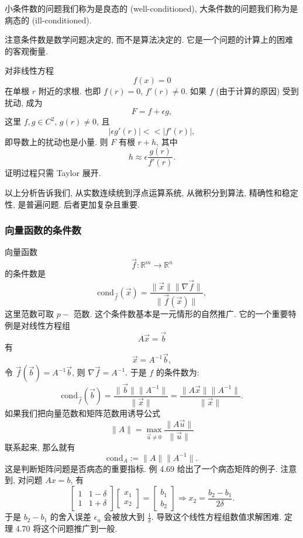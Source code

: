 \documentclass[a4paper]{ctexart}
\begin{document}
 小条件数的问题我们称为是良态的 (well-conditioned),
大条件数的问题我们称为是病态的 (ill-conditioned).

注意条件数是数学问题决定的, 而不是算法决定的. 它是一个问题的计算上的困难的客观衡量.

 对非线性方程
$$
f(x) = 0
$$
在单根 $r$ 附近的求根. 也即 $f(r) = 0$, $f'(r) \neq 0$.
如果 $f$ (由于计算的原因) 受到扰动, 成为
$$
F = f + \epsilon g,
$$
这里 $f, g \in C^2$, $g(r) \neq 0$, 且
$$
|\epsilon g'(r)| << |f'(r)|,
$$
即导数上的扰动也是小量. 则 $F$ 有根 $r + h$, 其中
$$
h \approx \epsilon \frac{g(r)}{f'(r)}.
$$
证明过程只需 Taylor 展开.

以上分析告诉我们, 从实数连续统到浮点运算系统, 从微积分到算法, 精确性和稳定性,
是普遍问题. 后者更加复杂且重要.

\subsubsection{向量函数的条件数}

 向量函数
$$
\vec{f} : \mathbb{R}^m \to \mathbb{R}^n 
$$
的条件数是
$$
\mbox{cond}_{\vec{f}}(\vec{x})
= \frac{\|\vec{x}\|\|\nabla\vec{f}\|}{\|\vec{f}(\vec{x})\|},
$$
这里范数可取 $p-$ 范数. 这个条件数基本是一元情形的自然推广.
它的一个重要特例是对线性方程组
$$
A \vec{x} = \vec{b}
$$
有
$$
\vec{x} = A^{-1}\vec{b},
$$
令 $\vec{f}(\vec{b}) = A^{-1}\vec{b}$, 则 $\nabla \vec{f} = A^{-1}$.
于是 $f$ 的条件数为:
$$
\mbox{cond}_{\vec{f}}(\vec{b})
= \frac{\|\vec{b}\|\|A^{-1}\|}{\|\vec{x}\|}
= \frac{\|A\vec{x}\|\|A^{-1}\|}{\|\vec{x}\|}.
$$
如果我们把向量范数和矩阵范数用诱导公式
$$
\|A\| = \max_{\vec{u} \neq 0}\frac{\|A\vec{u}\|}{\|\vec{u}\|}
$$
联系起来, 那么就有
$$
\mbox{cond}_A := \|A\|\|A^{-1}\|.
$$
这是判断矩阵问题是否病态的重要指标. 例 4.69 给出了一个病态矩阵的例子. 注意到, 
对问题 $A x = b$, 有
$$
\left[
\begin{array}{cc}
  1 & 1 - \delta \\
  1 & 1 + \delta
\end{array}
\right]\left[\begin{array}{c}
  x_1 \\ x_2
\end{array}
\right] = \left[\begin{array}{c}
  b_1 \\ b_2
\end{array} \right] \Rightarrow x_2 = \frac{b_2 - b_1}{2 \delta}.
$$
于是 $b_2 - b_1$ 的舍入误差 $\epsilon_u$ 会被放大到 $\frac{1}{\delta}$. 
导致这个线性方程组数值求解困难. 定理 4.70 将这个问题推广到一般. 
\end{document}
